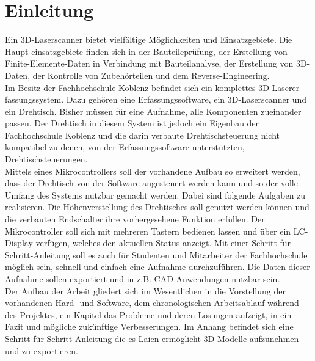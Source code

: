 \chapter{Einleitung}
\label{cha:Einleitung}
Ein 3D-Laserscanner bietet vielfältige Möglichkeiten und Einsatzgebiete. Die Haupt-einsatzgebiete finden sich in der Bauteileprüfung, der Erstellung von Finite-Elemente-Daten in Verbindung mit Bauteilanalyse, der Erstellung von 3D-Daten, der Kontrolle von Zubehörteilen und dem Reverse-Engineering.\\
Im Besitz der Fachhochschule Koblenz befindet sich ein komplettes 3D-Laserer-fassungssystem. Dazu gehören eine Erfassungssoftware, ein 3D-Laserscanner und ein Drehtisch. Bisher müssen für eine Aufnahme, alle Komponenten zueinander passen. Der Drehtisch in diesem System ist jedoch ein Eigenbau der Fachhochschule Koblenz und die darin verbaute Drehtischsteuerung nicht kompatibel zu denen, von der Erfassungssoftware unterstützten, Drehtischsteuerungen.\\
Mittels eines Mikrocontrollers soll der vorhandene Aufbau so erweitert werden, dass der Drehtisch von der Software angesteuert werden kann und so der volle Umfang des Systems nutzbar gemacht werden. Dabei sind folgende Aufgaben zu realisieren. Die Höhenverstellung des Drehtisches soll genutzt werden können und die verbauten Endschalter ihre vorhergesehene Funktion erfüllen. Der Mikrocontroller soll sich mit mehreren Tastern bedienen lassen und über ein LC-Display verfügen, welches den aktuellen Status anzeigt. Mit einer Schritt-für-Schritt-Anleitung soll es auch für Studenten und Mitarbeiter der Fachhochschule möglich sein, schnell und einfach eine Aufnahme durchzuführen. Die Daten dieser Aufnahme sollen exportiert und in z.B. CAD-Anwendungen nutzbar sein. \\
Der Aufbau der Arbeit gliedert sich im Wesentlichen in die Vorstellung der vorhandenen Hard- und Software, dem chronologischen Arbeitsablauf während des Projektes, ein Kapitel das Probleme und deren Lösungen aufzeigt, in ein Fazit und mögliche zukünftige Verbesserungen. Im Anhang befindet sich eine Schritt-für-Schritt-Anleitung die es Laien ermöglicht 3D-Modelle aufzunehmen und zu exportieren.